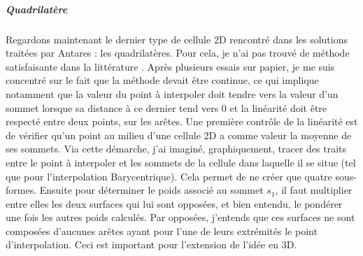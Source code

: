 \newpage

\subparagraph{Quadrilatère}

Regardons maintenant le dernier type de cellule 2D rencontré dans les solutions traitées par Antares : les quadrilatères.
Pour cela, je n'ai pas trouvé de méthode satisfaisante dans la littérature \cite{perronnet1998}. Après plusieurs essais sur papier, je me suis concentré sur le fait que la méthode devait être continue, ce qui implique notamment que la valeur du point à interpoler doit tendre vers la valeur d'un sommet lorsque sa distance à ce dernier tend vers 0 et la linéarité doit être respecté entre deux points, sur les arêtes.
Une première contrôle de la linéarité est de vérifier qu'un point au milieu d'une cellule 2D a comme valeur la moyenne de ses sommets.
Via cette démarche, j'ai imaginé, graphiquement, tracer des traits entre le point à interpoler et les sommets de la cellule dans laquelle il se situe (tel que pour l'interpolation Barycentrique).
Cela permet de ne créer que quatre sous-formes.
Ensuite pour déterminer le poids associé au sommet \( s_1 \), il faut multiplier entre elles les deux surfaces qui lui sont opposées, et bien entendu, le pondérer une fois les autres poids calculés.
Par opposées, j'entends que ces surfaces ne sont composées d'aucunes arêtes ayant pour l'une de leurs extrémités le point d'interpolation. Ceci est important pour l'extension de l'idée en 3D.

